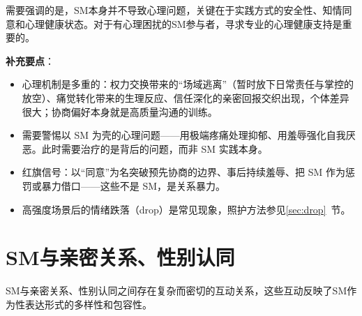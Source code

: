 \documentclass[12pt,UTF8]{ctexbook}
\begin{document}
需要强调的是，SM本身并不导致心理问题，关键在于实践方式的安全性、知情同意和心理健康状态。对于有心理困扰的SM参与者，寻求专业的心理健康支持是重要的。

\noindent\textbf{补充要点}：
\begin{itemize}
\item 心理机制是多重的：权力交换带来的“场域逃离”（暂时放下日常责任与掌控的放空）、痛觉转化带来的生理反应、信任深化的亲密回报交织出现，个体差异很大；协商偏好本身就是高质量沟通的训练。
\item 需要警惕以 SM 为壳的心理问题——用极端疼痛处理抑郁、用羞辱强化自我厌恶。此时需要治疗的是背后的问题，而非 SM 实践本身。
\item 红旗信号：以“同意”为名突破预先协商的边界、事后持续羞辱、把 SM 作为惩罚或暴力借口——这些不是 SM，是关系暴力。
\item 高强度场景后的情绪跌落（drop）是常见现象，照护方法参见\ref{sec:drop}~节。
\end{itemize}

\section{SM与亲密关系、性别认同}

SM与亲密关系、性别认同之间存在复杂而密切的互动关系，这些互动反映了SM作为性表达形式的多样性和包容性。
\end{document}
